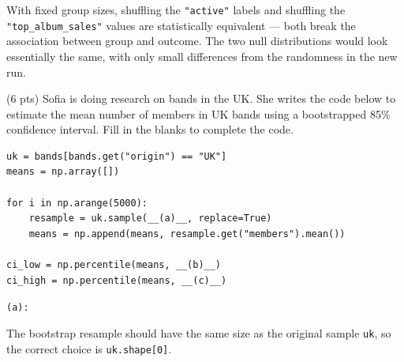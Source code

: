 \documentclass[twoside,12pt]{article}
\begin{document}
\begin{probset}
\begin{prob}[(18 pts)]
\begin{subprobset}
\begin{subprob}
\smallskip
{}

\smallskip
{}

\smallskip
{}

\begin{soln}
With fixed group sizes, shuffling the \texttt{"active"} labels and shuffling the \texttt{"top\_album\_sales"} values are statistically equivalent --- both break the association between group and outcome. The two null distributions would look essentially the same, with only small differences from the randomness in the new run.
\end{soln}

\end{subprob}

\end{subprobset}

\end{prob}

\newpage

\begin{prob}[(16 pts)]
\begin{subprobset}

\begin{subprob}(6 pts)
Sofia is doing research on bands in the UK. She writes the code below to estimate the mean number of members in UK bands using a bootstrapped 85\% confidence interval. Fill in the blanks to complete the code.

\bigskip

\begin{verbatim}
uk = bands[bands.get("origin") == "UK"]
means = np.array([])

for i in np.arange(5000):
    resample = uk.sample(__(a)__, replace=True)
    means = np.append(means, resample.get("members").mean())

ci_low = np.percentile(means, __(b)__)
ci_high = np.percentile(means, __(c)__)
\end{verbatim}

\bigskip
\texttt{(a):} 

\begin{soln}
The bootstrap resample should have the same size as the original sample \texttt{uk}, so the correct choice is \texttt{uk.shape[0]}.
\end{soln}


\end{subprob}
\end{subprobset}
\end{prob}
\end{probset}
\end{document}
